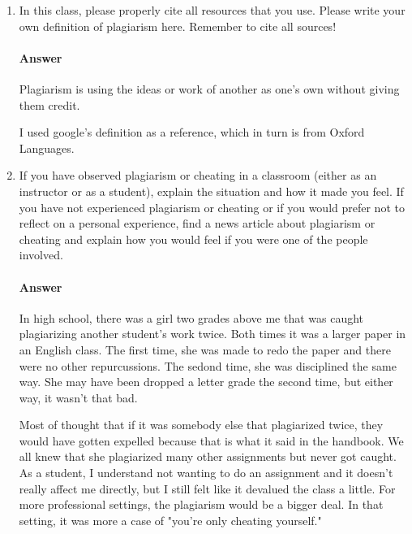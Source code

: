 \documentclass{article}
\begin{document}
\collab{}

\begin{enumerate}

    \item In this class, please properly cite all resources that you use. Please
          write your own definition of plagiarism here.  Remember to cite all
          sources!
          
          \paragraph{Answer}
          Plagiarism is using the ideas or work of another as one's own without giving them credit.
          
          I used google's definition as a reference, which in turn is from Oxford Languages.
          
    \item If you have observed plagiarism or cheating in a classroom (either as
          an instructor or as a student), explain the situation and how it made
          you feel.  If you have not experienced plagiarism or cheating or if you
          would prefer not to reflect on a personal experience, find a news
          article about plagiarism or cheating and explain how you would feel if
          you were one of the people involved.
          
          \paragraph{Answer}
          In high school, there was a girl two grades above me that was caught plagiarizing
          another student's work twice. Both times it was a larger paper in an English class.
          The first time, she was made to redo the paper and there were no other repurcussions.
          The sedond time, she was disciplined the same way. She may have been dropped a letter grade
          the second time, but either way, it wasn't that bad. 
          
          Most of thought that if it was somebody else that plagiarized twice, they would have gotten expelled
          because that is what it said in the handbook. We all knew that she plagiarized many other assignments
          but never got caught. As a student, I understand not wanting to do an assignment and it doesn't really
          affect me directly, but I still felt like it devalued the class a little. For more professional settings,
          the plagiarism would be a bigger deal. In that setting, it was more a case of "you're only cheating yourself."
          
          
\end{enumerate}
\end{document}

